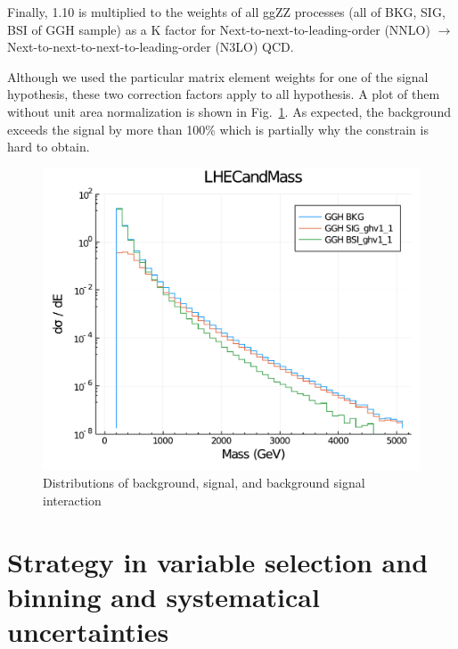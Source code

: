 Finally, 1.10 is multiplied to the weights of all ggZZ processes (all of BKG, SIG, BSI
of GGH sample) as a K factor for Next-to-next-to-leading-order (NNLO) $\rightarrow$ 
Next-to-next-to-next-to-leading-order (N3LO) QCD.

Although we used the particular matrix element weights for one of the signal hypothesis, these two
correction factors apply to all hypothesis. A plot of them without unit area normalization is shown
in Fig.~\ref{fig:bsi_sig_bkg_compare}. As expected, the background exceeds the signal by more than 100\%
which is partially why the constrain is hard to obtain.
\begin{figure}[htb]
    \begin{center}
        \includegraphics[width=.7\linewidth]{fig/LHE_integral_difference.pdf}
    \end{center}
    \caption{Distributions of background, signal, and background signal interaction}
    \label{fig:bsi_sig_bkg_compare}
\end{figure}
\clearpage
\section{Strategy in variable selection and binning and systematical uncertainties}

